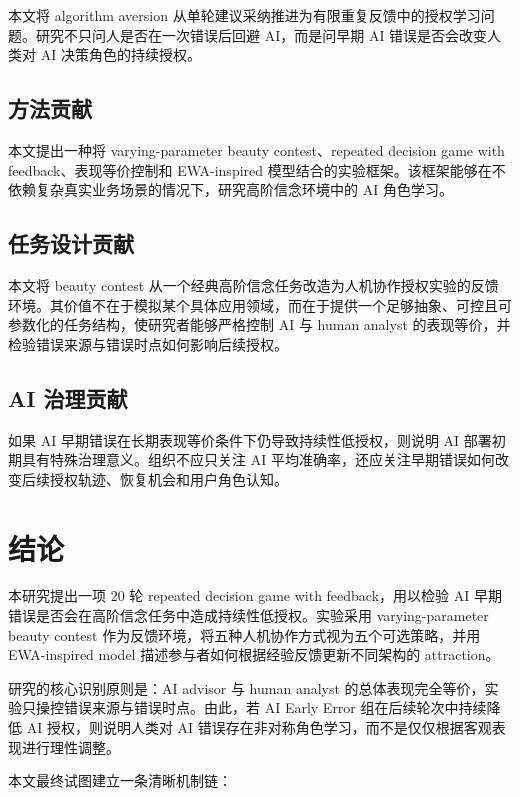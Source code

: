 \documentclass[12pt]{article}
\begin{document}
本文将 algorithm aversion 从单轮建议采纳推进为有限重复反馈中的授权学习问题。研究不只问人是否在一次错误后回避 AI，而是问早期 AI 错误是否会改变人类对 AI 决策角色的持续授权。

\subsection{方法贡献}

本文提出一种将 varying-parameter beauty contest、repeated decision game with feedback、表现等价控制和 EWA-inspired 模型结合的实验框架。该框架能够在不依赖复杂真实业务场景的情况下，研究高阶信念环境中的 AI 角色学习。

\subsection{任务设计贡献}

本文将 beauty contest 从一个经典高阶信念任务改造为人机协作授权实验的反馈环境。其价值不在于模拟某个具体应用领域，而在于提供一个足够抽象、可控且可参数化的任务结构，使研究者能够严格控制 AI 与 human analyst 的表现等价，并检验错误来源与错误时点如何影响后续授权。

\subsection{AI 治理贡献}

如果 AI 早期错误在长期表现等价条件下仍导致持续性低授权，则说明 AI 部署初期具有特殊治理意义。组织不应只关注 AI 平均准确率，还应关注早期错误如何改变后续授权轨迹、恢复机会和用户角色认知。

\section{结论}

本研究提出一项 20 轮 repeated decision game with feedback，用以检验 AI 早期错误是否会在高阶信念任务中造成持续性低授权。实验采用 varying-parameter beauty contest 作为反馈环境，将五种人机协作方式视为五个可选策略，并用 EWA-inspired model 描述参与者如何根据经验反馈更新不同架构的 attraction。

研究的核心识别原则是：AI advisor 与 human analyst 的总体表现完全等价，实验只操控错误来源与错误时点。由此，若 AI Early Error 组在后续轮次中持续降低 AI 授权，则说明人类对 AI 错误存在非对称角色学习，而不是仅仅根据客观表现进行理性调整。

本文最终试图建立一条清晰机制链：
\end{document}
